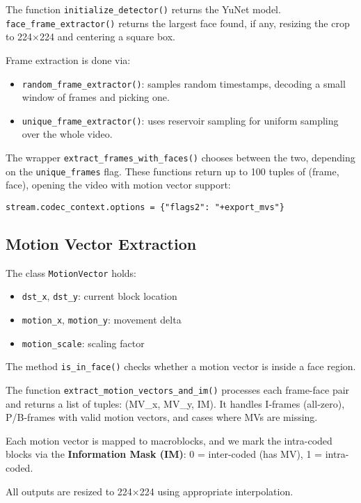\documentclass[a4paper,12pt]{article}
\begin{document}
The function \texttt{initialize\_detector()} returns the YuNet model. \texttt{face\_frame\_extractor()} returns the largest face found, if any, resizing the crop to 224×224 and centering a square box.

Frame extraction is done via:
\begin{itemize}
  \item \texttt{random\_frame\_extractor()}: samples random timestamps, decoding a small window of frames and picking one.
  \item \texttt{unique\_frame\_extractor()}: uses reservoir sampling for uniform sampling over the whole video.
\end{itemize}

The wrapper \texttt{extract\_frames\_with\_faces()} chooses between the two, depending on the \texttt{unique\_frames} flag. These functions return up to 100 tuples of (frame, face), opening the video with motion vector support:
\begin{lstlisting}
stream.codec_context.options = {"flags2": "+export_mvs"}
\end{lstlisting}

\subsection{Motion Vector Extraction}

The class \texttt{MotionVector} holds:
\begin{itemize}
  \item \texttt{dst\_x}, \texttt{dst\_y}: current block location
  \item \texttt{motion\_x}, \texttt{motion\_y}: movement delta
  \item \texttt{motion\_scale}: scaling factor
\end{itemize}

The method \texttt{is\_in\_face()} checks whether a motion vector is inside a face region.

The function \texttt{extract\_motion\_vectors\_and\_im()} processes each frame-face pair and returns a list of tuples: (MV\_x, MV\_y, IM). It handles I-frames (all-zero), P/B-frames with valid motion vectors, and cases where MVs are missing.

Each motion vector is mapped to macroblocks, and we mark the intra-coded blocks via the \textbf{Information Mask (IM)}: 0 = inter-coded (has MV), 1 = intra-coded.

All outputs are resized to 224×224 using appropriate interpolation.
\end{document}
